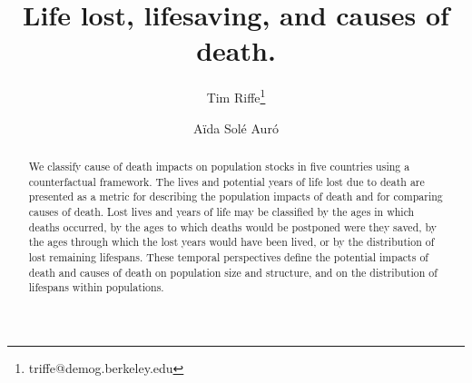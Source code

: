 \documentclass{article}
\begin{document}
\title{Life lost, lifesaving, and causes of death.}

\author[1]{Tim Riffe\thanks{triffe@demog.berkeley.edu}}
\author[2]{A{\"i}da Sol\'{e} Aur\'{o}}

\maketitle

%
\begin{abstract}
We classify cause of death impacts on population stocks in five countries using
a counterfactual framework. The lives and potential years of life lost due to death are presented as a metric for describing the population impacts of death and for comparing causes of
death. Lost lives and years of life may be classified by the ages in which
deaths occurred, by the ages to which deaths would be postponed were they saved, by the
ages through which the lost years would have been lived, or by the distribution of
lost remaining lifespans. These temporal perspectives define the
potential impacts of death and causes of death on population size and structure,
and on the distribution of lifespans within populations. 
\end{abstract}

%
\end{document}
